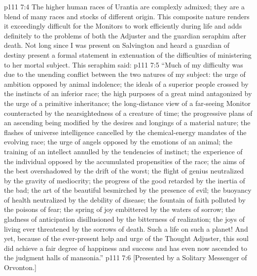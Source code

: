 \vs p111 7:4 The higher human races of Urantia are complexly admixed; they are a blend of many races and stocks of different origin. This composite nature renders it exceedingly difficult for the Monitors to work efficiently during life and adds definitely to the problems of both the Adjuster and the guardian seraphim after death. Not long since I was present on Salvington and heard a guardian of destiny present a formal statement in extenuation of the difficulties of ministering to her mortal subject. This seraphim said:
\pc \vs p111 7:5 “Much of my difficulty was due to the unending conflict between the two natures of my subject: the urge of ambition opposed by animal indolence; the ideals of a superior people crossed by the instincts of an inferior race; the high purposes of a great mind antagonized by the urge of a primitive inheritance; the long\hyp{}distance view of a far\hyp{}seeing Monitor counteracted by the nearsightedness of a creature of time; the progressive plans of an ascending being modified by the desires and longings of a material nature; the flashes of universe intelligence cancelled by the chemical\hyp{}energy mandates of the evolving race; the urge of angels opposed by the emotions of an animal; the training of an intellect annulled by the tendencies of instinct; the experience of the individual opposed by the accumulated propensities of the race; the aims of the best overshadowed by the drift of the worst; the flight of genius neutralized by the gravity of mediocrity; the progress of the good retarded by the inertia of the bad; the art of the beautiful besmirched by the presence of evil; the buoyancy of health neutralized by the debility of disease; the fountain of faith polluted by the poisons of fear; the spring of joy embittered by the waters of sorrow; the gladness of anticipation disillusioned by the bitterness of realization; the joys of living ever threatened by the sorrows of death. Such a life on such a planet! And yet, because of the ever\hyp{}present help and urge of the Thought Adjuster, this soul did achieve a fair degree of happiness and success and has even now ascended to the judgment halls of mansonia.”
\vsetoff
\vs p111 7:6 [Presented by a Solitary Messenger of Orvonton.]
